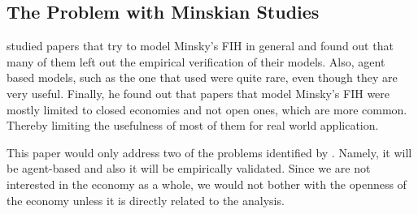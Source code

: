 \documentclass[12pt, a4paper]{article}
\begin{document}
	\subsection{The Problem with Minskian Studies}
	 studied papers that try to model Minsky's FIH in general and found out that many of them left out the empirical verification of their models. Also, agent based models, such as the one that  used were quite rare, even though they are very useful. Finally, he found out that papers that model Minsky's FIH were mostly limited to closed economies and not open ones, which are more common. Thereby limiting the usefulness of most of them for real world application.
	
	This paper would only address two of the problems identified by . Namely, it will be agent-based and also it will be empirically validated. Since we are not interested in the economy as a whole, we would not bother with the openness of the economy unless it is directly related to the analysis.
	\newpage
	\singlespacing
		
	
\end{document}
